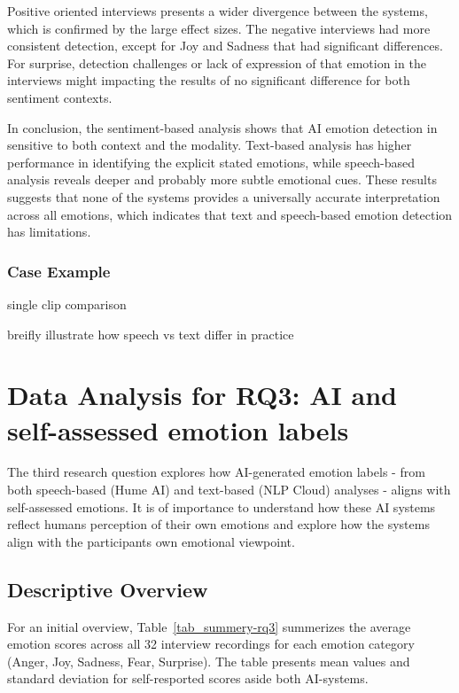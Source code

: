 Positive oriented interviews presents a wider divergence between the systems, which is confirmed by the large effect sizes. 
The negative interviews had more consistent detection, except for Joy and Sadness that had significant differences. 
For surprise, detection challenges or lack of expression of that emotion in the interviews might impacting the results of no significant difference for both sentiment contexts. 

In conclusion, the sentiment-based analysis shows that AI emotion detection in sensitive to both context and the modality. 
Text-based analysis has higher performance in identifying the explicit stated emotions, while speech-based 
analysis reveals deeper and probably more subtle emotional cues. 
These results suggests that none of the systems provides a universally accurate interpretation across all emotions,
which indicates that text and speech-based emotion detection has limitations. 


\subsubsection{Case Example}
single clip comparison 

breifly illustrate how speech vs text differ in practice 




\section{Data Analysis for RQ3: AI and self-assessed emotion labels}

The third research question explores how AI-generated emotion labels - from both speech-based (Hume AI) and text-based (NLP Cloud) 
analyses - aligns with self-assessed emotions. It is of importance to understand how these AI systems reflect humans perception of 
their own emotions and explore how the systems align with the participants own emotional viewpoint.  
\subsection{Descriptive Overview}

For an initial overview, Table~\ref{tab_summery-rq3} summerizes the average emotion scores across all 32 interview recordings 
for each emotion category (Anger, Joy, Sadness, Fear, Surprise). The table presents mean values and standard deviation for self-resported scores 
aside both AI-systems.

